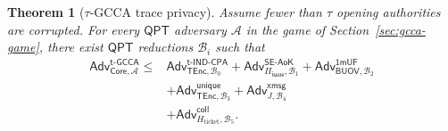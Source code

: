 \documentclass[11pt]{article}
\newtheorem{theorem}[definition]{Theorem}
\newcommand{\Core}{\mathsf{Core}}
\newcommand{\BUOV}{\mathsf{BUOV}}
\newcommand{\Piiss}{\Pi_{\mathsf{issue}}}
\newcommand{\TEnc}{\mathsf{TEnc}}
\newcommand{\Adv}{\mathsf{Adv}}
\newcommand{\QPT}{\mathsf{QPT}}
\begin{document}
\begin{theorem}[$\tau$-GCCA trace privacy]\label{thm:gcca}
Assume fewer than $\tau$ opening authorities are corrupted.  For every $\QPT$
adversary $\mathcal A$ in the game of Section~\ref{sec:gcca-game}, there exist $\QPT$
reductions $\mathcal B_i$ such that
\begin{align*}
 \Adv^{\mathsf{t\text{-}GCCA}}_{\Core,\mathcal A}
 \leq{}&
 \Adv^{\mathsf{t\text{-}IND\text{-}CPA}}_{\TEnc,\mathcal B_0}
 +\Adv^{\mathsf{SE\text{-}AoK}}_{\Piiss,\mathcal B_1}
 +\Adv^{\mathsf{1mUF}}_{\BUOV,\mathcal B_2}\\
 &+\Adv^{\mathsf{unique}}_{\TEnc,\mathcal B_3}
 +\Adv^{\mathsf{xmsg}}_{J,\mathcal B_4}\\
 &
 +\Adv^{\mathsf{coll}}_{H_{\mathrm{ticket}},\mathcal B_5}.
\end{align*}
\end{theorem}
\end{document}
